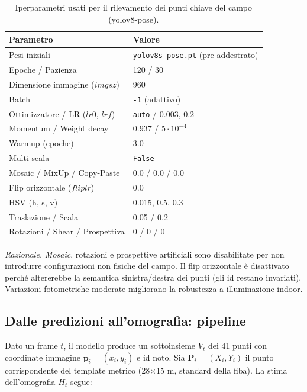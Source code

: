 \documentclass[12pt,a4paper,openright,twoside]{book}
\begin{document}
\begin{table}[h]
  \centering
  \caption{Iperparametri usati per il rilevamento dei punti chiave del campo (\ac{yolo}v8-pose).}
  \label{tab:hyperparams_keypoints}
  \begin{tabular}{l l}
    \toprule
    \textbf{Parametro} & \textbf{Valore} \\
    \midrule
    Pesi iniziali & \texttt{yolov8s-pose.pt} (pre-addestrato) \\
    Epoche / Pazienza & 120 / 30 \\
    Dimensione immagine ($imgsz$) & 960 \\
    Batch & \texttt{-1} (adattivo) \\
    Ottimizzatore / LR ($lr0$, $lrf$) & \texttt{auto} / 0.003, 0.2 \\
    Momentum / Weight decay & 0.937 / $5\cdot10^{-4}$ \\
    Warmup (epoche) & 3.0 \\
    Multi-scala & \texttt{False} \\
    Mosaic / MixUp / Copy-Paste & 0.0 / 0.0 / 0.0 \\
    Flip orizzontale ($fliplr$) & 0.0 \\
    HSV (h, s, v) & 0.015, 0.5, 0.3 \\
    Traslazione / Scala & 0.05 / 0.2 \\
    Rotazioni / Shear / Prospettiva & 0 / 0 / 0 \\
    \bottomrule
  \end{tabular}
\end{table}

\noindent
\textit{Razionale.} \emph{Mosaic}, rotazioni e prospettive artificiali sono disabilitate
per non introdurre configurazioni non fisiche del campo. Il flip orizzontale è disattivato
perché altererebbe la semantica sinistra/destra dei punti (gli \ac{id} restano invariati).
Variazioni fotometriche moderate migliorano la robustezza a illuminazione indoor.

\subsection{Dalle predizioni all'omografia: pipeline}
\label{subsec:homography-pipeline}

Dato un frame $t$, il modello produce un sottoinsieme $V_t$ dei 41 punti con
coordinate immagine $\mathbf{p}_i=(x_i,y_i)$ e \ac{id} noto.
Sia $\mathbf{P}_i=(X_i,Y_i)$ il punto corrispondente del template metrico
(28$\times$15 m, standard della \ac{fiba}). La stima dell'omografia $H_t$ segue:
\end{document}
